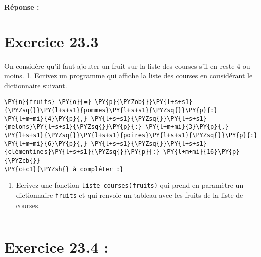 \documentclass[12pt]{book}
\begin{document}
    \textbf{Réponse :}

    \hypertarget{exercice-23.3}{%
\section{Exercice 23.3}\label{exercice-23.3}}

On considère qu'il faut ajouter un fruit sur la liste des courses s'il
en reste 4 ou moins. 1. Ecrivez un programme qui affiche la liste des
courses en considérant le dictionnaire suivant.

    \begin{tcolorbox}[breakable, size=fbox, boxrule=1pt, pad at break*=1mm,colback=cellbackground, colframe=cellborder]
\begin{Verbatim}[commandchars=\\\{\}]
\PY{n}{fruits} \PY{o}{=} \PY{p}{\PYZob{}}\PY{l+s+s1}{\PYZsq{}}\PY{l+s+s1}{pommes}\PY{l+s+s1}{\PYZsq{}}\PY{p}{:} \PY{l+m+mi}{4}\PY{p}{,} \PY{l+s+s1}{\PYZsq{}}\PY{l+s+s1}{melons}\PY{l+s+s1}{\PYZsq{}}\PY{p}{:} \PY{l+m+mi}{3}\PY{p}{,} \PY{l+s+s1}{\PYZsq{}}\PY{l+s+s1}{poires}\PY{l+s+s1}{\PYZsq{}}\PY{p}{:} \PY{l+m+mi}{6}\PY{p}{,} \PY{l+s+s1}{\PYZsq{}}\PY{l+s+s1}{clémentines}\PY{l+s+s1}{\PYZsq{}}\PY{p}{:} \PY{l+m+mi}{16}\PY{p}{\PYZcb{}}
\PY{c+c1}{\PYZsh{} à compléter :}
\end{Verbatim}
\end{tcolorbox}

    \begin{enumerate}
\def\labelenumi{\arabic{enumi}.}
\setcounter{enumi}{1}
\tightlist
\item
  Ecrivez une fonction \texttt{liste\_courses(fruits)} qui prend en
  paramètre un dictionnaire \texttt{fruits} et qui renvoie un tableau
  avec les fruits de la liste de courses.
\end{enumerate}

    \begin{tcolorbox}[breakable, size=fbox, boxrule=1pt, pad at break*=1mm,colback=cellbackground, colframe=cellborder]
\begin{Verbatim}[commandchars=\\\{\}]

\end{Verbatim}
\end{tcolorbox}

    \hypertarget{exercice-23.4}{%
\section{Exercice 23.4 :}\label{exercice-23.4}}
\end{document}

